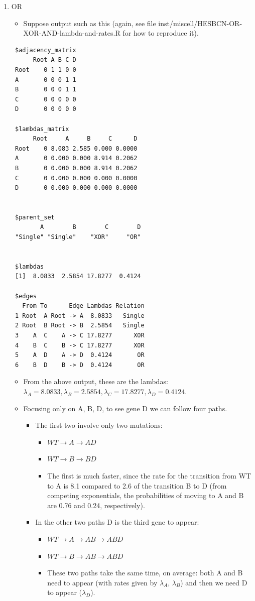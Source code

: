 \documentclass[a4paper,11pt]{article}
\begin{document}
\begin{enumerate}
\item OR
\label{sec:org9d47997}
\begin{itemize}
\item Suppose output such as this (again, see file inst/miscell/HESBCN-OR-XOR-AND-lambda-and-rates.R for how to reproduce it).
\end{itemize}

\begin{verbatim}
 $adjacency_matrix
      Root A B C D
 Root    0 1 1 0 0
 A       0 0 0 1 1
 B       0 0 0 1 1
 C       0 0 0 0 0
 D       0 0 0 0 0

 $lambdas_matrix
      Root     A     B     C      D
 Root    0 8.083 2.585 0.000 0.0000
 A       0 0.000 0.000 8.914 0.2062
 B       0 0.000 0.000 8.914 0.2062
 C       0 0.000 0.000 0.000 0.0000
 D       0 0.000 0.000 0.000 0.0000


 $parent_set
        A        B        C        D 
 "Single" "Single"    "XOR"     "OR" 


 $lambdas
 [1]  8.0833  2.5854 17.8277  0.4124

 $edges
   From To      Edge Lambdas Relation
 1 Root  A Root -> A  8.0833   Single
 2 Root  B Root -> B  2.5854   Single
 3    A  C    A -> C 17.8277      XOR
 4    B  C    B -> C 17.8277      XOR
 5    A  D    A -> D  0.4124       OR
 6    B  D    B -> D  0.4124       OR

\end{verbatim}

\begin{itemize}
\item From the above output, these are the lambdas: $\lambda_A = 8.0833, \lambda_B = 2.5854, \lambda_C = 17.8277, \lambda_D = 0.4124$.
\item Focusing only on A, B, D, to see gene D we can follow four paths.
\begin{itemize}
\item The first two involve only two mutations:
\begin{itemize}
\item \(WT \rightarrow A \rightarrow AD\)
\item \(WT \rightarrow B \rightarrow BD\)
\item The first is much faster, since the rate for the transition from WT to A is 8.1 compared to 2.6 of the transition B to D (from competing exponentials, the probabilities of moving to A and B are 0.76 and 0.24, respectively).
\end{itemize}
\item In the other two paths D is the third gene to appear:
\begin{itemize}
\item \(WT \rightarrow A \rightarrow AB \rightarrow ABD\)
\item \(WT \rightarrow B \rightarrow AB \rightarrow ABD\)
\item These two paths take the same time, on average: both A and B need to appear (with rates given by \(\lambda_A\), \(\lambda_B\)) and then we need D to appear (\(\lambda_D\)).
\end{itemize}


\end{itemize}
\end{itemize}
\end{enumerate}
\end{document}
